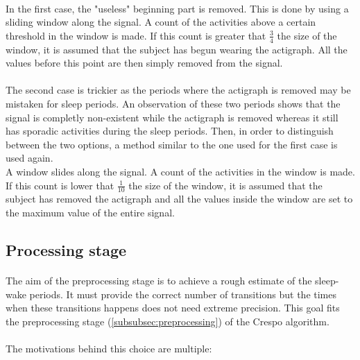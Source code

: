 \documentclass[a4paper,12pt]{article}
\begin{document}
\paragraph{}
In the first case, the "useless" beginning part is removed. This is done by using a sliding window along the signal. A count of the activities above a certain threshold in the window is made. If this count is greater that $\frac{3}{4}$ the size of the window, it is assumed that the subject has begun wearing the actigraph. All the values before this point are then simply removed from the signal.

\paragraph{}
The second case is trickier as the periods where the actigraph is removed may be mistaken for sleep periods. An observation of these two periods shows that the signal is completly non-existent while the actigraph is removed whereas it still has sporadic activities during the sleep periods. Then, in order to distinguish between the two options, a method similar to the one used for the first case is used again. \\
A window slides along the signal. A count of the activities in the window is made. If this count is lower that $\frac{1}{10}$ the size of the window, it is assumed that the subject has removed the actigraph and all the values inside the window are set to the maximum value of the entire signal.

\subsection{Processing stage}
\label{subsec:processing}
\paragraph{}
The aim of the preprocessing stage is to achieve a rough estimate of the sleep-wake periods. It must provide the correct number of transitions but the times when these transitions happens does not need extreme precision. This goal fits the preprocessing stage (\ref{subsubsec:preprocessing}) of the Crespo algorithm.

\paragraph{}
The motivations behind this choice are multiple:
\end{document}

